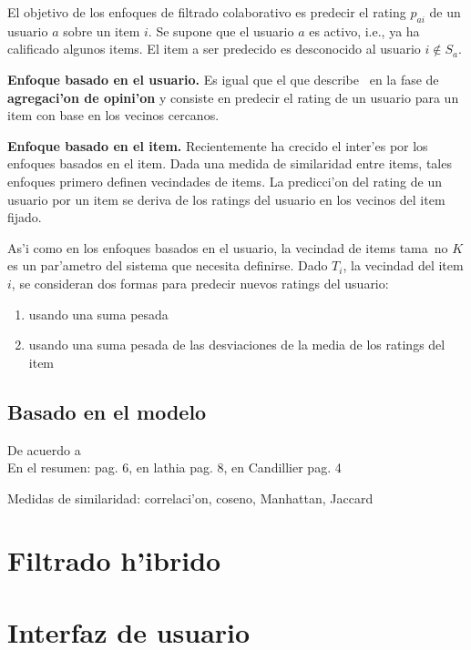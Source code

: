 \documentclass[11pt]{article}
\begin{document}
El objetivo de los enfoques de filtrado colaborativo es predecir el rating $p_{ai}$ de un usuario $a$ sobre un item $i$. Se supone que el usuario $a$ es activo, i.e., ya ha calificado algunos items. El item a ser predecido es desconocido al usuario $i \notin S_{a}$.

\smallskip
\textbf{Enfoque basado en el usuario.} Es igual que el que describe~\cite{recsys:nlathia} en la fase de \textbf{agregaci'on de opini'on} y consiste en predecir el rating de un usuario para un item con base en los vecinos cercanos.

\smallskip
\textbf{Enfoque basado en el item.} Recientemente ha crecido el inter'es por los enfoques basados en el item. Dada una medida de similaridad entre items, tales enfoques primero definen vecindades de items. La predicci'on del rating de un usuario por un item se deriva de los ratings del usuario en los vecinos del item fijado.

As'i como en los enfoques basados en el usuario, la vecindad de items tama~no $K$ es un par'ametro del sistema que necesita definirse. Dado $T_i$, la vecindad del item $i$, se consideran dos formas para predecir nuevos ratings del usuario:

\begin{enumerate}
\item usando una suma pesada
\item usando una suma pesada de las desviaciones de la media de los ratings del item
\end{enumerate}


\subsection{Basado en el modelo}
De acuerdo a~\cite{recsys:nlathia}\\
En el resumen: pag. 6, en lathia pag. 8, en Candillier pag. 4

Medidas de similaridad: correlaci'on, coseno, Manhattan, Jaccard

\section{Filtrado h'ibrido}

\section{Interfaz de usuario}
\end{document}
